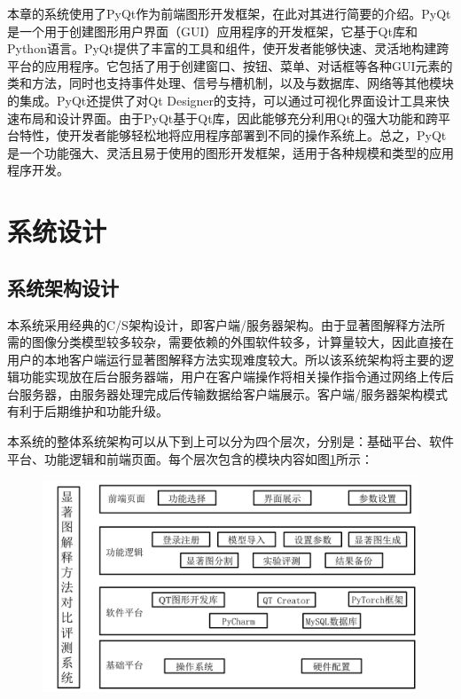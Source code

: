 本章的系统使用了PyQt作为前端图形开发框架，在此对其进行简要的介绍。PyQt是一个用于创建图形用户界面（GUI）应用程序的开发框架，它基于Qt库和Python语言。PyQt提供了丰富的工具和组件，使开发者能够快速、灵活地构建跨平台的应用程序。它包括了用于创建窗口、按钮、菜单、对话框等各种GUI元素的类和方法，同时也支持事件处理、信号与槽机制，以及与数据库、网络等其他模块的集成。PyQt还提供了对Qt Designer的支持，可以通过可视化界面设计工具来快速布局和设计界面。由于PyQt基于Qt库，因此能够充分利用Qt的强大功能和跨平台特性，使开发者能够轻松地将应用程序部署到不同的操作系统上。总之，PyQt是一个功能强大、灵活且易于使用的图形开发框架，适用于各种规模和类型的应用程序开发。

\section{系统设计}
\subsection{系统架构设计}
本系统采用经典的C/S架构设计，即客户端/服务器架构。由于显著图解释方法所需的图像分类模型较多较杂，需要依赖的外围软件较多，计算量较大，因此直接在用户的本地客户端运行显著图解释方法实现难度较大。所以该系统架构将主要的逻辑功能实现放在后台服务器端，用户在客户端操作将相关操作指令通过网络上传后台服务器，由服务器处理完成后传输数据给客户端展示。客户端/服务器架构模式有利于后期维护和功能升级。

本系统的整体系统架构可以从下到上可以分为四个层次，分别是：基础平台、软件平台、功能逻辑和前端页面。每个层次包含的模块内容如图\ref{fig:sys}所示：

\begin{figure}[h]
	\centering 
	\includegraphics[width=15cm]{fig/ch5/sys.png}
	\label{fig:sys}
\end{figure}
